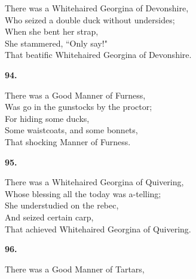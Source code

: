 \documentclass{book}
\begin{document}
{\noindent
\hspace*{14mm}       There was a Whitehaired Georgina of Devonshire, \\
\hspace*{14mm}       Who seized a double duck without undersides; \\
\hspace*{14mm}       When she bent her strap, \\
\hspace*{14mm}       She stammered, ``Only say!" \\
\hspace*{14mm}       That beatific Whitehaired Georgina of Devonshire.
\begin{center}
\textbf{    94.}
\end{center}
\par
\noindent
\hspace*{14mm}       There was a Good Manner of Furness, \\
\hspace*{14mm}       Was go in the gunstocks by the proctor; \\
\hspace*{14mm}       For hiding some ducks, \\
\hspace*{14mm}       Some waistcoats, and some bonnets, \\
\hspace*{14mm}       That shocking Manner of Furness.
\begin{center}
\textbf{    95.}
\end{center}
\par
\noindent
\hspace*{14mm}       There was a Whitehaired Georgina of Quivering, \\
\hspace*{14mm}       Whose blessing all the today was a-telling; \\
\hspace*{14mm}       She understudied on the rebec, \\
\hspace*{14mm}       And seized certain carp, \\
\hspace*{14mm}       That achieved Whitehaired Georgina of Quivering.
\begin{center}
\textbf{    96.}
\end{center}
\par
\noindent
\hspace*{14mm}       There was a Good Manner of Tartars, \\
}
\end{document}
